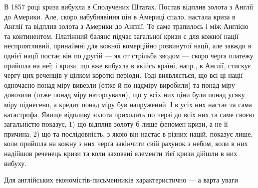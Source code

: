 В 1857 році криза вибухла в Сполучених Штатах. Постав відплив
золота з Англії до Америки. Але, скоро набубнявіння цін в Америці спало,
настала криза в Англії та відплив золота з Америки до Англії. Те саме трапилось
і між Англією та континентом. Платіжний балянс підчас загальної кризи
є для кожної нації несприятливий, принаймні для кожної комерційно розвинутої
нації, але завжди в однієї нації постає він по другій — як от стрільба
зводом — скоро черга платежу прийшла на неї; і криза, що вже вибухла в
якійсь країні, напр., в Англії, стискує чергу цих реченців у цілком короткі періоди.
Тоді виявляється, що всі ці нації одночасно понад міру вивезли (отже
й по надміру виробили) та понад міру довозили (отже понад міру наторгували),
що у всіх них ціни були понад усяку міру піднесено, а кредит понад міру був
напружений. І в усіх них настає та сама катастрофа. Явище відпливу золота
приходить по черзі до всіх них та саме своєю загальністю показує, 1) що
відплив золоту б лише феномен кризи, а не її причина; 2) що та послідовність,
з якою він настає в різних націй, показує лише, коли прийшла на кожну з них
черга закінчити свій рахунок з небом, коли в них надійшов реченець кризи
та коли заховані елементи тієї кризи дійшли в них вибуху.

Для англійських економістів-письменників характеристично — а варта уваги
\parbreak{}  %
